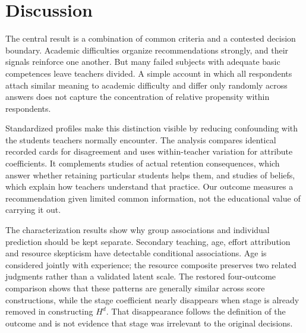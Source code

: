 \section{Discussion}
The central result is a combination of common criteria and a contested decision boundary. Academic difficulties organize recommendations strongly, and their signals reinforce one another. But many failed subjects with adequate basic competences leave teachers divided. A simple account in which all respondents attach similar meaning to academic difficulty and differ only randomly across answers does not capture the concentration of relative propensity within respondents.


Standardized profiles make this distinction visible by reducing confounding with the students teachers normally encounter. The analysis compares identical recorded cards for disagreement and uses within-teacher variation for attribute coefficients. It complements studies of actual retention consequences, which answer whether retaining particular students helps them, and studies of beliefs, which explain how teachers understand that practice. Our outcome measures a recommendation given limited common information, not the educational value of carrying it out.

The characterization results show why group associations and individual prediction should be kept separate. Secondary teaching, age, effort attribution and resource skepticism have detectable conditional associations. Age is considered jointly with experience; the resource composite preserves two related judgments rather than a validated latent scale. The restored four-outcome comparison shows that these patterns are generally similar across score constructions, while the stage coefficient nearly disappears when stage is already removed in constructing $H^d$. That disappearance follows the definition of the outcome and is not evidence that stage was irrelevant to the original decisions.

